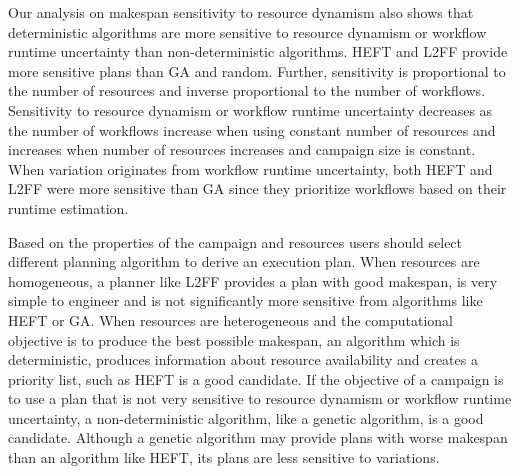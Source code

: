 Our analysis on makespan sensitivity to resource dynamism also shows that
deterministic algorithms are more sensitive to resource dynamism or workflow
runtime uncertainty than non-deterministic algorithms. HEFT and L2FF provide
more sensitive plans than GA and random. Further, sensitivity is proportional
to the number of resources and inverse proportional to the number of workflows.
Sensitivity to resource dynamism or workflow runtime uncertainty decreases as
the number of workflows increase when using constant number of resources and
increases when number of resources increases and campaign size is constant.
When variation originates from workflow runtime uncertainty, both HEFT and
L2FF were more sensitive than GA since they prioritize workflows based on
their runtime estimation.

Based on the properties of the campaign and resources users should select
different planning algorithm to derive an execution plan. When resources are
homogeneous, a planner like L2FF provides a plan with good makespan, is very
simple to engineer and is not significantly more sensitive from algorithms
like HEFT or GA. When resources are heterogeneous and the computational
objective is to produce the best possible makespan, an algorithm which is
deterministic, produces information about resource availability and creates a
priority list, such as HEFT is a good candidate. If the objective of a
campaign is to use a plan that is not very sensitive to resource dynamism or
workflow runtime uncertainty, a non-deterministic algorithm, like a genetic
algorithm, is a good candidate. Although a genetic algorithm may provide plans
with worse makespan than an algorithm like HEFT, its plans are less sensitive
to variations.



